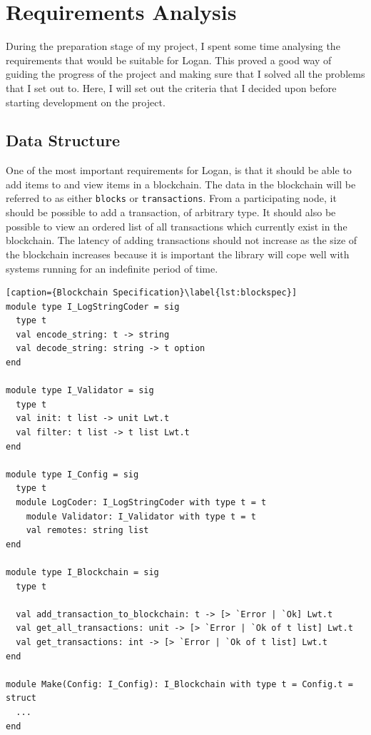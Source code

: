 \documentclass[12pt,a4paper,twoside,openright]{report}
\begin{document}
	\section{Requirements Analysis} \label{Requirements Analysis}
	During the preparation stage of my project, I spent some time analysing the requirements that would be suitable for Logan. 
	This proved a good way of guiding the progress of the project and making sure that I solved all the problems that I set out to. 
	Here, I will set out the criteria that I decided upon before starting development on the project.
	\subsection{Data Structure}
	One of the most important requirements for Logan, is that it should be able to add items to and view items in a blockchain. 
	The data in the blockchain will be referred to as either \texttt{blocks} or \texttt{transactions}. 
	From a participating node, it should be possible to add a transaction, of arbitrary type. 
	It should also be possible to view an ordered list of all transactions which currently exist in the blockchain.
	The latency of adding transactions should not increase as the size of the blockchain increases because it is important the library will cope well with systems running for an indefinite period of time.
	\begin{minipage}{\linewidth}
	\begin{lstlisting}[caption={Blockchain Specification}\label{lst:blockspec}]
module type I_LogStringCoder = sig
  type t
  val encode_string: t -> string
  val decode_string: string -> t option
end

module type I_Validator = sig 
  type t 
  val init: t list -> unit Lwt.t 
  val filter: t list -> t list Lwt.t
end

module type I_Config = sig
  type t
  module LogCoder: I_LogStringCoder with type t = t
	module Validator: I_Validator with type t = t
	val remotes: string list
end

module type I_Blockchain = sig
  type t

  val add_transaction_to_blockchain: t -> [> `Error | `Ok] Lwt.t
  val get_all_transactions: unit -> [> `Error | `Ok of t list] Lwt.t
  val get_transactions: int -> [> `Error | `Ok of t list] Lwt.t
end

module Make(Config: I_Config): I_Blockchain with type t = Config.t = struct 
  ...
end
	\end{lstlisting}
	\end{minipage}\\
\end{document}
